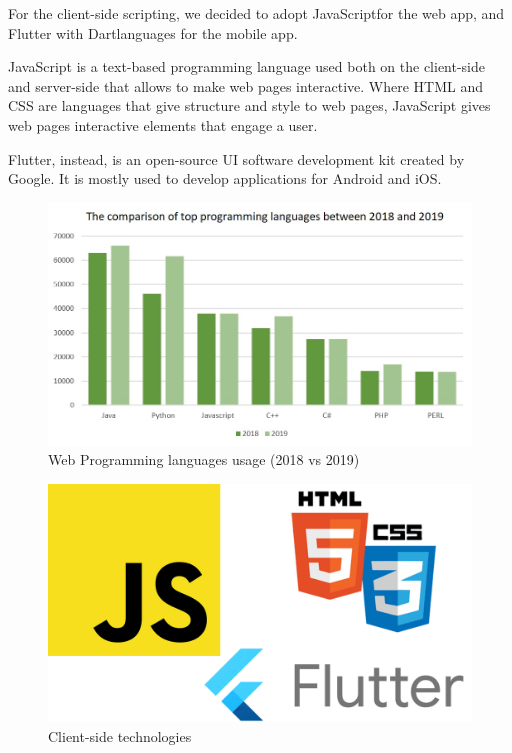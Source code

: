 \documentclass[table, 12pt]{article}
\begin{document}
For the client-side scripting, we decided to adopt JavaScript\texttrademark  for the web app, and Flutter with Dart\texttrademark  languages for the mobile app.

JavaScript is a text-based programming language used both on the client-side and server-side that allows to make web pages interactive. Where HTML and CSS are languages that give structure and style to web pages, JavaScript gives web pages interactive elements that engage a user.

Flutter, instead, is an open-source UI software development kit created by Google. It is mostly used to develop applications for Android and iOS.

\begin{figure}[H]
    \includegraphics[width=\textwidth]{assets/graph-18-19-languages.jpg}
    \caption{Web Programming languages usage (2018 vs 2019)}
    \label{languages_comparison}
\end{figure}

\begin{figure}[H]
    \includegraphics[width=\textwidth]{assets/client-side-scripting.png}
    \caption{Client-side technologies}
\end{figure}
\end{document}
